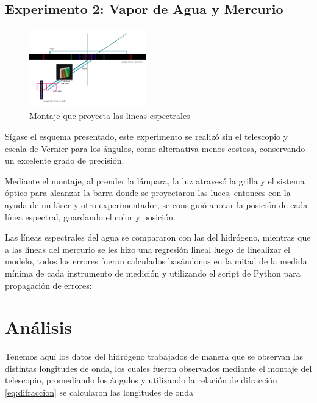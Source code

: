 \documentclass[a4paper,twocolumn,10pt]{article}
\begin{document}
\subsection{Experimento 2: Vapor de Agua y Mercurio}
\begin{figure}[H]
    \centering
    \includegraphics[width=0.45\textwidth]{Imagenes/Rydberg/experimentorydberg_agua_mercurio.png}
    \caption{Montaje que proyecta las lineas espectrales}
    \label{fig:rydbergmercury}
\end{figure}
Sígase el esquema presentado, este experimento se realizó sin el telescopio y escala de Vernier para los ángulos, como alternativa menos costosa, conservando un excelente grado de precisión.

Mediante el montaje, al prender la lámpara, la luz atravesó la grilla y el sistema óptico para alcanzar la barra donde se proyectaron las luces, entonces con la ayuda de un láser y otro experimentador, se consiguió anotar la posición de cada línea espectral, guardando el color y posición.

Las líneas espectrales del agua se compararon con las del hidrógeno, mientras que a las líneas del mercurio se les hizo una regresión lineal luego de linealizar el modelo, todos los errores fueron calculados basándonos en la mitad de la medida mínima de cada instrumento de medición y utilizando el script de Python para propagación de errores: \cite{github:errores}

\section{Análisis}
Tenemos aquí los datos del hidrógeno trabajados de manera que se observan las distintas longitudes de onda, los cuales fueron observados mediante el montaje del telescopio, promediando los ángulos y utilizando la relación de difracción \ref{eq:difraccion} se calcularon las longitudes de onda
\end{document}
